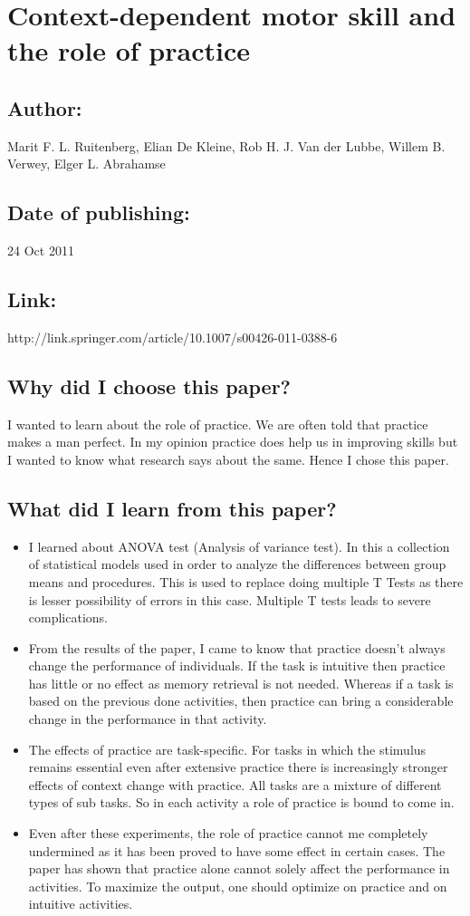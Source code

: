 \documentclass{article}
\begin{document}
	\section{Context-dependent motor skill and the role of practice}
		\subsection{Author:} Marit F. L. Ruitenberg, Elian De Kleine, Rob H. J. Van der Lubbe, Willem B. Verwey, Elger L. Abrahamse
		\subsection{Date of publishing:} 24 Oct 2011
		\subsection{Link:} http://link.springer.com/article/10.1007/s00426-011-0388-6
		\subsection{Why did I choose this paper?}
			I wanted to learn about the role of practice. We are often told that practice makes a man perfect. In my opinion practice does help us in improving skills but I wanted to know what research says about the same. Hence I chose this paper. 
		\subsection{What did I learn from this paper?}
			\begin{itemize}
				\item I learned about ANOVA test (Analysis of variance test). In this a collection of statistical models used in order to analyze the differences between group means and procedures. This is used to replace doing multiple T Tests as there is lesser possibility of errors in this case. Multiple T tests leads to severe complications.
				\item From the results of the paper, I came to know that practice doesn't always change the performance of individuals. If the task is intuitive then practice has little or no effect as memory retrieval is not needed. Whereas if a task is based on the previous done activities, then practice can bring a considerable change in the performance in that activity.
				\item The effects of practice are task-specific. For tasks in which the stimulus remains essential even after extensive practice there is increasingly stronger effects of context change with practice. All tasks are a mixture of different types of sub tasks. So in each activity a role of practice is bound to come in.
				\item Even after these experiments, the role of practice cannot me completely undermined as it has been proved to have some effect in certain cases. The paper has shown that practice alone cannot solely affect the performance in activities. To maximize the output, one should optimize on practice and on intuitive activities.
			\end{itemize} 
	
\end{document}
